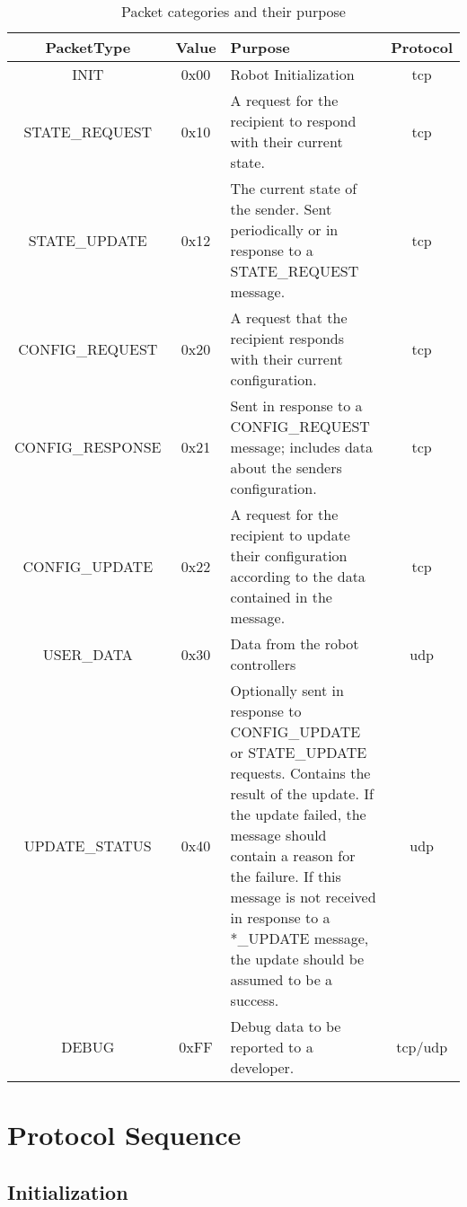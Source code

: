 \documentclass[11pt]{article}
\begin{document}
\begin{table}[h!]
    \centering
    \caption{Packet categories and their purpose}
    \label{tab:pktTypes}
    \begin{tabular}{|c|c|p{3in}|c|}
        \hline
        PacketType & Value & Purpose & Protocol \\ 
        \hline
        INIT & 0x00 & Robot Initialization & \acrshort{tcp} \\ 
        \hline
        STATE\_REQUEST & 0x10 & A request for the recipient to respond with their current state. & \acrshort{tcp} \\
        \hline
        STATE\_UPDATE & 0x12 & The current state of the sender. 
        Sent periodically or in response to a STATE\_REQUEST message. & \acrshort{tcp} \\
        \hline
        CONFIG\_REQUEST & 0x20 & A request that the recipient responds with their current configuration. & \acrshort{tcp} \\
        \hline
        CONFIG\_RESPONSE & 0x21 & Sent in response to a CONFIG\_REQUEST message; 
            includes data about the senders configuration. & \acrshort{tcp} \\
        \hline
        CONFIG\_UPDATE & 0x22 & A request for the recipient to update their configuration according to the data contained 
            in the message. & \acrshort{tcp} \\
        \hline
        USER\_DATA & 0x30 & Data from the robot controllers & \acrshort{udp} \\
        \hline
        UPDATE\_STATUS & 0x40 & Optionally sent in response to CONFIG\_UPDATE or STATE\_UPDATE requests.
        Contains the result of the update.  If the update failed, the message should contain a reason for the failure.
        If this message is not received in response to a *\_UPDATE message, the update should be assumed to be a success.
        & \acrshort{udp} \\
        \hline
        DEBUG & 0xFF & Debug data to be reported to a developer. & \acrshort{tcp}/\acrshort{udp} \\
        \hline
    \end{tabular}
\end{table}

\section {Protocol Sequence}
\subsection{Initialization}
\end{document}

